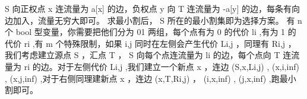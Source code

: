 {}\markdownRendererDollarSign{} S \markdownRendererDollarSign{}向正权点\markdownRendererDollarSign{} x \markdownRendererDollarSign{}连流量为\markdownRendererDollarSign{} a[x] \markdownRendererDollarSign{}的边，负权点\markdownRendererDollarSign{} y \markdownRendererDollarSign{}向\markdownRendererDollarSign{} T \markdownRendererDollarSign{}连流量为\markdownRendererDollarSign{} -a[y] \markdownRendererDollarSign{}的边，每条有向边加入，流量无穷大即可。\markdownRendererParagraphSeparator
{}求最小割后，\markdownRendererDollarSign{} S \markdownRendererDollarSign{}所在的最小割集即为选择方案。\markdownRendererInterblockSeparator
{}
\markdownRendererSectionEnd \markdownRendererSectionBegin
{}\markdownRendererInterblockSeparator
{}有\markdownRendererDollarSign{} n \markdownRendererDollarSign{}个\markdownRendererDollarSign{} bool \markdownRendererDollarSign{}型变量，你需要把他们分为\markdownRendererDollarSign{} 01 \markdownRendererDollarSign{}两组，每个点有为\markdownRendererDollarSign{} 0 \markdownRendererDollarSign{}的代价\markdownRendererDollarSign{} l\markdownRendererUnderscore{}i \markdownRendererDollarSign{},有为\markdownRendererDollarSign{} 1 \markdownRendererDollarSign{}的代价\markdownRendererDollarSign{} r\markdownRendererUnderscore{}i \markdownRendererDollarSign{},有\markdownRendererDollarSign{} m \markdownRendererDollarSign{}个特殊限制，如果\markdownRendererDollarSign{} i,j \markdownRendererDollarSign{}同时在左侧会产生代价\markdownRendererDollarSign{} L\markdownRendererUnderscore{}\markdownRendererLeftBrace{}i,j\markdownRendererRightBrace{} \markdownRendererDollarSign{}，同理有\markdownRendererDollarSign{} R\markdownRendererUnderscore{}\markdownRendererLeftBrace{}i,j\markdownRendererRightBrace{} \markdownRendererDollarSign{}，我们考虑建立源点\markdownRendererDollarSign{} S \markdownRendererDollarSign{}，汇点\markdownRendererDollarSign{} T \markdownRendererDollarSign{}，\markdownRendererDollarSign{} S \markdownRendererDollarSign{}向每个点连流量为\markdownRendererDollarSign{} l\markdownRendererUnderscore{}i \markdownRendererDollarSign{}的边，每个点向\markdownRendererDollarSign{} T \markdownRendererDollarSign{}连流量为\markdownRendererDollarSign{} r\markdownRendererUnderscore{}i \markdownRendererDollarSign{}的边。对于左侧代价\markdownRendererDollarSign{} L\markdownRendererUnderscore{}\markdownRendererLeftBrace{}i,j\markdownRendererRightBrace{} \markdownRendererDollarSign{},我们建立一个新点\markdownRendererDollarSign{} x \markdownRendererDollarSign{}，连边\markdownRendererDollarSign{} (S,x,L\markdownRendererUnderscore{}\markdownRendererLeftBrace{}i,j\markdownRendererRightBrace{}) \markdownRendererDollarSign{},\markdownRendererDollarSign{} (x,i,inf) \markdownRendererDollarSign{},\markdownRendererDollarSign{} (x,j,inf) \markdownRendererDollarSign{},对于右侧同理建新点\markdownRendererDollarSign{} x \markdownRendererDollarSign{}，连边\markdownRendererDollarSign{} (x,T,R\markdownRendererUnderscore{}\markdownRendererLeftBrace{}i,j\markdownRendererRightBrace{}) \markdownRendererDollarSign{}，\markdownRendererDollarSign{} (i,x,inf) \markdownRendererDollarSign{},\markdownRendererDollarSign{} (j,x,inf) \markdownRendererDollarSign{},跑最小割即可。\markdownRendererInterblockSeparator
